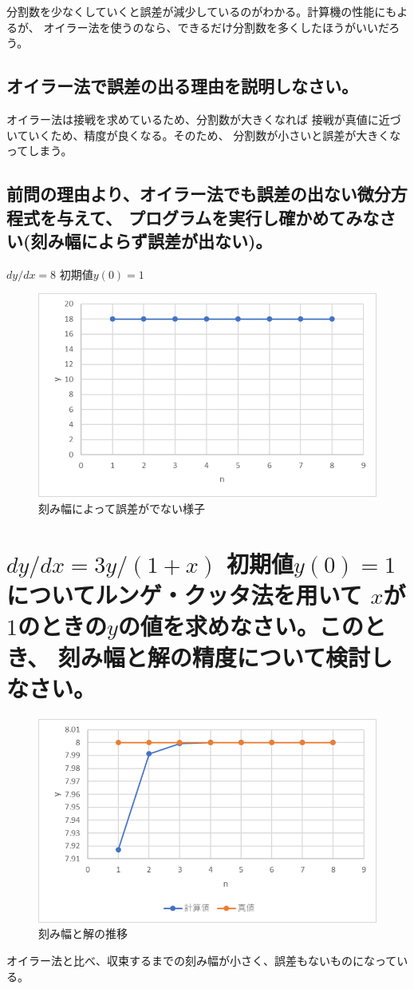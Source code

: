 \documentclass[a4paper,11pt]{jsarticle}
\begin{document}
    分割数を少なくしていくと誤差が減少しているのがわかる。計算機の性能にもよるが、
    オイラー法を使うのなら、できるだけ分割数を多くしたほうがいいだろう。

  \subsection{オイラー法で誤差の出る理由を説明しなさい。}

    オイラー法は接戦を求めているため、分割数が大きくなれば
    接戦が真値に近づいていくため、精度が良くなる。そのため、
    分割数が小さいと誤差が大きくなってしまう。

  \subsection{前問の理由より、オイラー法でも誤差の出ない微分方程式を与えて、
              プログラムを実行し確かめてみなさい(刻み幅によらず誤差が出ない)。}
  
    $dy/dx=8$ 初期値$y(0)=1$

    \begin{figure}[h]
      \centering
      \includegraphics[scale=0.75]{4}
      \caption{刻み幅によって誤差がでない様子}
      \label{fig:4}
    \end{figure}

\section{$dy/dx=3y/(1+x)$ 初期値$y(0)=1$についてルンゲ・クッタ法を用いて
          $x$が$1$のときの$y$の値を求めなさい。このとき、
          刻み幅と解の精度について検討しなさい。}

  \begin{figure}[h]
    \centering
    \includegraphics[scale=0.75]{5}
    \caption{刻み幅と解の推移}
    \label{fig:5}
  \end{figure}

  オイラー法と比べ、収束するまでの刻み幅が小さく、誤差もないものになっている。
        
\end{document}
